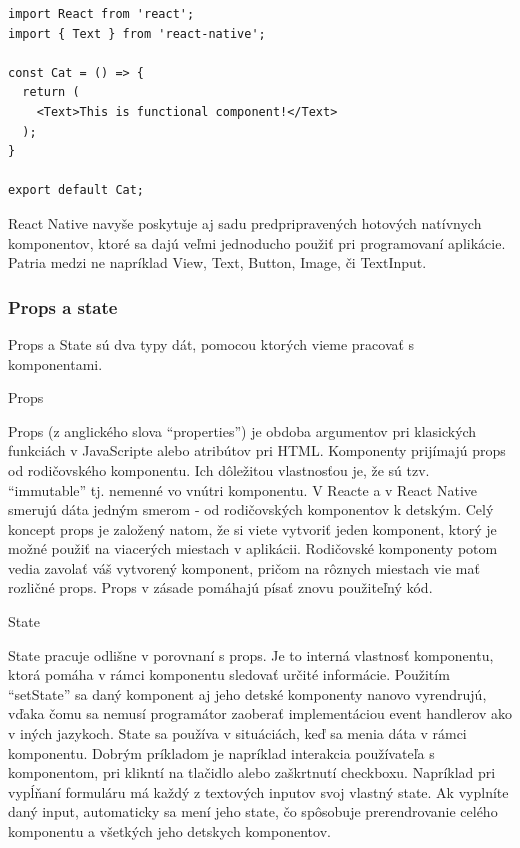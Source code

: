 \begin{itemize}[leftmargin=*]
\begin{lstlisting}[caption={Príklad function komponentu}, label={funcComponent}]
import React from 'react';
import { Text } from 'react-native';

const Cat = () => {
  return (
    <Text>This is functional component!</Text>
  );
}

export default Cat;
\end{lstlisting}

\end{itemize}

React Native navyše poskytuje aj sadu predpripravených hotových natívnych komponentov, ktoré sa dajú veľmi jednoducho použiť pri programovaní aplikácie. Patria medzi ne napríklad View, Text, Button, Image, či TextInput. \\

\subsubsection{Props a state}
Props a State sú dva typy dát, pomocou ktorých vieme pracovať s komponentami.
\begin{itemize}[leftmargin=*]
{\bf \item Props} \newline
Props (z anglického slova ``properties'') je obdoba argumentov pri klasických funkciách v JavaScripte alebo atribútov pri HTML. Komponenty prijímajú props od rodičovského komponentu. Ich dôležitou vlastnosťou je, že sú tzv. ``immutable'' tj. nemenné vo vnútri komponentu. V Reacte a v React Native smerujú dáta jedným smerom - od rodičovských komponentov k detským. Celý koncept props je založený natom, že si viete vytvoriť jeden komponent, ktorý je možné použiť na viacerých miestach v aplikácii. Rodičovské komponenty potom vedia zavolať váš vytvorený komponent, pričom na rôznych miestach vie mať rozličné props. Props v zásade pomáhajú písať znovu použiteľný kód.
{\bf \item State} \newline
State pracuje odlišne v porovnaní s props. Je to interná vlastnosť komponentu, ktorá pomáha v rámci komponentu sledovať určité informácie. Použitím ``setState'' sa daný komponent aj jeho detské komponenty nanovo vyrendrujú, vďaka čomu sa nemusí programátor zaoberať implementáciou event handlerov ako v iných jazykoch. State sa používa v situáciách, keď sa menia dáta v rámci komponentu. Dobrým príkladom je napríklad interakcia používateľa s komponentom, pri klikntí na tlačidlo alebo zaškrtnutí checkboxu. Napríklad pri vypĺňaní formuláru má každý z textových inputov svoj vlastný state. Ak vyplníte daný input, automaticky sa mení jeho state, čo spôsobuje prerendrovanie celého komponentu a všetkých jeho detskych komponentov. \\
\end{itemize} 
